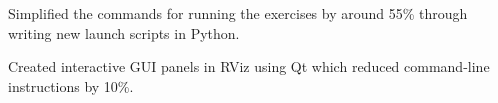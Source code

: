 \begin{work}
\begin{workdetail-list}
        \item Simplified the commands for running the exercises by around 55\% through writing new
              launch scripts in Python.

        \item Created interactive GUI panels in RViz using Qt which reduced command-line instructions
              by 10\%.


        \end{workdetail-list}

\end{work}





